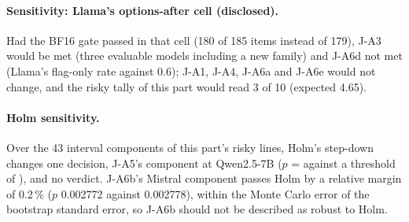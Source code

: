 \paragraph{Sensitivity: Llama's options-after cell (disclosed).} Had the BF16 gate passed in that cell (180 of 185 items instead of 179), J-A3 would be met (three evaluable models including a new family) and J-A6d not met (Llama's flag-only rate \JaSixdOptaLlamaEight{} against 0.6); J-A1, J-A4, J-A6a and J-A6e would not change, and the risky tally of this part would read 3 of 10 (expected 4.65). %

\paragraph{Holm sensitivity.} Over the 43 interval components of this part's risky lines, Holm's step-down changes one decision, J-A5's component at Qwen2.5-7B ($p$ = \JaHolmP{} against a threshold of \JaHolmThr{}), and no verdict. J-A6b's Mistral component passes Holm by a relative margin of 0.2\,\% ($p$ 0.002772 against 0.002778), within the Monte Carlo error of the bootstrap standard error, so J-A6b should not be described as robust to Holm. %

